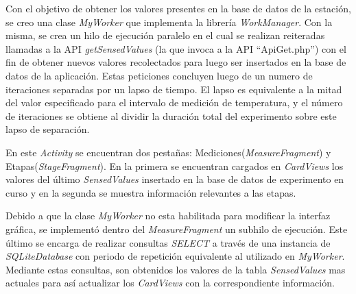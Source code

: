              \par Con el objetivo de obtener los valores presentes en la base de datos de la estación, se creo una clase \textit{MyWorker} que implementa la librería \textit{WorkManager}. Con la misma, se crea un hilo de ejecución paralelo en el cual se realizan reiteradas llamadas a la API \textit{getSensedValues} (la que invoca a la API ``ApiGet.php'') con el fin de obtener nuevos valores recolectados para luego ser insertados en la base de datos de la aplicación. Estas peticiones concluyen luego de un numero de iteraciones separadas por un lapso de tiempo. El lapso es equivalente a la mitad del valor especificado para el intervalo de medición de temperatura, y el número de iteraciones se obtiene al dividir la duración total del experimento sobre este lapso de separación.
             
            \par En este \textit{Activity} se encuentran dos pestañas: Mediciones(\textit{MeasureFragment}) y Etapas(\textit{StageFragment}). En la primera se encuentran cargados en \textit{CardViews} los valores del último \textit{SensedValues} insertado en la base de datos de experimento en curso y en la segunda se muestra información relevantes a las etapas.
            
            \par Debido a que la clase \textit{MyWorker} no esta habilitada para modificar la interfaz gráfica, se implementó dentro del \textit{MeasureFragment} un subhilo de ejecución. Este último se encarga de realizar consultas \textit{SELECT} a través de una instancia de \textit{SQLiteDatabase} con periodo de repetición equivalente al utilizado en \textit{MyWorker}. Mediante estas consultas, son obtenidos  los valores de la tabla \textit{SensedValues} mas actuales para así actualizar los \textit{CardViews} con la correspondiente información.
            
